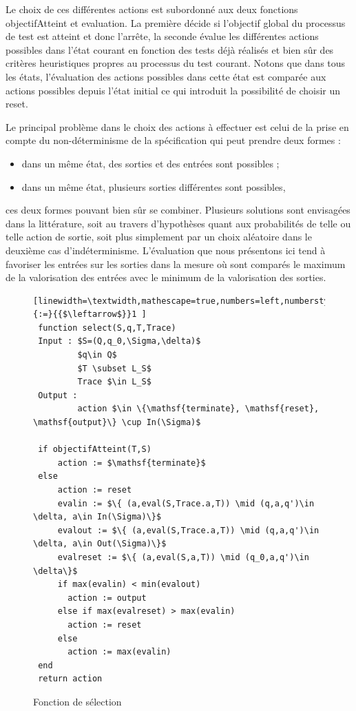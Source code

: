 Le choix de ces diff\'erentes actions est subordonn\'e aux deux
fonctions \textsf{objectifAtteint} et \textsf{evaluation}. La
premi\`ere d\'ecide si l'objectif global du processus de test est
atteint et donc l'arr\^ete, la seconde \'evalue les diff\'erentes
actions possibles dans l'\'etat courant en fonction des tests
d\'ej\`a r\'ealis\'es et bien s\^ur des crit\`eres heuristiques
propres au processus du test courant. Notons que dans tous les
\'etats, l'\'evaluation des actions possibles dans cette \'etat est
compar\'ee aux actions possibles depuis l'\'etat initial ce qui
introduit la possibilit\'e de choisir un \textsf{reset}.

Le principal probl\`eme dans le choix des actions \`a effectuer est
celui de la prise en compte du non-d\'eterminisme de la
sp\'ecification qui peut prendre deux formes : 
\begin{itemize}
  \item dans un m\^eme \'etat, des sorties et des entr\'ees sont
    possibles ;
  \item dans un m\^eme \'etat, plusieurs sorties diff\'erentes sont possibles,
\end{itemize}
ces deux formes pouvant bien s\^ur se combiner. Plusieurs solutions
sont envisag\'ees dans la litt\'erature, soit au travers
d'hypoth\`eses quant aux probabilit\'es de telle ou telle action de
sortie, soit plus simplement par un choix al\'eatoire dans le
deuxi\`eme cas d'ind\'eterminisme.
L'\'evaluation que nous pr\'esentons ici tend \`a favoriser les
entr\'ees sur les sorties dans la mesure o\`u sont compar\'es le
maximum de la valorisation des entr\'ees avec le minimum de la
valorisation des sorties. 


\begin{figure}[htbp]
    \centering
    \begin{lstlisting}[linewidth=\textwidth,mathescape=true,numbers=left,numberstyle=\tiny,literate={:=}{{$\leftarrow$}}1 ]
 function select(S,q,T,Trace)
 Input : $S=(Q,q_0,\Sigma,\delta)$
         $q\in Q$
         $T \subset L_S$ 
         Trace $\in L_S$ 
 Output : 
         action $\in \{\mathsf{terminate}, \mathsf{reset}, \mathsf{output}\} \cup In(\Sigma)$

 if objectifAtteint(T,S)  
     action := $\mathsf{terminate}$
 else 
     action := reset
     evalin := $\{ (a,eval(S,Trace.a,T)) \mid (q,a,q')\in \delta, a\in In(\Sigma)\}$
     evalout := $\{ (a,eval(S,Trace.a,T)) \mid (q,a,q')\in \delta, a\in Out(\Sigma)\}$
     evalreset := $\{ (a,eval(S,a,T)) \mid (q_0,a,q')\in \delta\}$
     if max(evalin) < min(evalout) 
       action := output
     else if max(evalreset) > max(evalin)
       action := reset
     else 
       action := max(evalin)
 end
 return action
 \end{lstlisting}
 \caption{Fonction de s\'election}
 \label{fig-algo-select}
 \end{figure}

